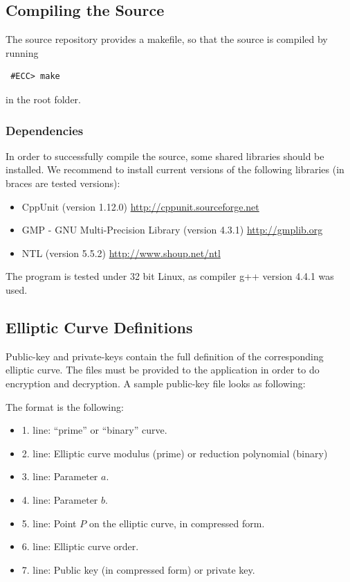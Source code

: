 \documentclass[11pt,english]{article}
\begin{document}
\subsection{Compiling the Source}
The source repository provides a makefile, so that the source is compiled by running
\begin{verbatim}
 #ECC> make
\end{verbatim}
in the root folder.

\subsubsection{Dependencies}
In order to successfully compile the source, some shared libraries should be installed. We recommend to install current versions of the following libraries (in braces are tested versions):

\begin{itemize}
 \item CppUnit (version 1.12.0) \url{http://cppunit.sourceforge.net}
 \item GMP - GNU Multi-Precision Library (version 4.3.1) \url{http://gmplib.org}
 \item NTL (version 5.5.2) \url{http://www.shoup.net/ntl}
\end{itemize}

The program is tested under 32 bit Linux, as compiler g++ version 4.4.1 was used.

\subsection{Elliptic Curve Definitions}
\label{ecdefinitions}
Public-key and private-keys contain the full definition of the corresponding elliptic curve. The files must be provided to the application in order to do encryption and decryption. A sample public-key file looks as following:

The format is the following:

\begin{itemize}
 \item 1. line: ``prime'' or ``binary'' curve.
 \item 2. line: Elliptic curve modulus (prime) or reduction polynomial (binary)
 \item 3. line: Parameter $a$.
 \item 4. line: Parameter $b$.
 \item 5. line: Point $P$ on the elliptic curve, in compressed form.
 \item 6. line: Elliptic curve order.
 \item 7. line: Public key (in compressed form) or private key.
\end{itemize}
\end{document}
